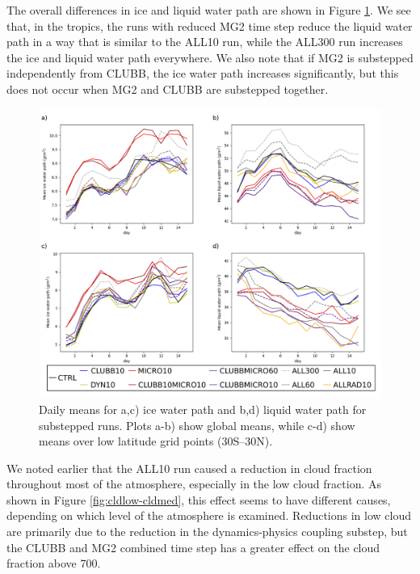 \documentclass [11pt, proquest] {uwthesis}[2020/02/24]
\begin{document}
The overall differences in ice and liquid water path are shown in Figure \ref{fig:water-path}. We see that, in the tropics, the runs with reduced MG2 time step reduce the liquid water path in a way that is similar to the ALL10 run, while the ALL300 run increases the ice and liquid water path everywhere. We also note that if MG2 is substepped independently from CLUBB, the ice water path increases significantly, but this does not occur when MG2 and CLUBB are substepped together.

\begin{figure}
    \centering
    \includegraphics[width=5.5in]{Figure10.png}
    \caption{Daily means for a,c) ice water path and b,d) liquid water path for substepped runs. Plots a-b) show global means, while c-d) show means over low latitude grid points (\num{30}S--\num{30}N).}
    \label{fig:water-path}
\end{figure}

We noted earlier that the ALL10 run caused a reduction in cloud fraction throughout most of the atmosphere, especially in the low cloud fraction. As shown in Figure \ref{fig:cldlow-cldmed}, this effect seems to have different causes, depending on which level of the atmosphere is examined. Reductions in low cloud are primarily due to the reduction in the dynamics-physics coupling substep, but the CLUBB and MG2 combined time step has a greater effect on the cloud fraction above \SI{700}{\millibar}.
\end{document}
